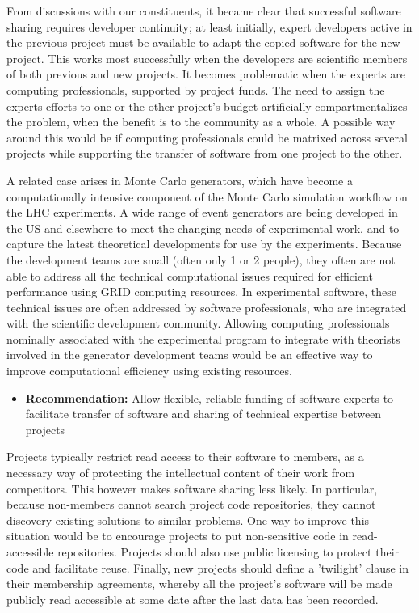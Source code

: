 From discussions with our constituents, it became clear that successful
software sharing requires developer continuity; at least
initially, expert developers active in the previous project must be available
to adapt the copied software for the new project.
This works most successfully when the developers are scientific members
of both previous and new projects.  It becomes problematic
when the experts are computing professionals, supported by project funds.
The need to assign the experts efforts to one or
the other project's budget artificially compartmentalizes the problem,
when the benefit is to the community as a whole.
A possible way around this would be if computing professionals could be
matrixed across several projects while supporting the
transfer of software from one project to the other.

A related case arises in Monte Carlo generators, which
have become a computationally intensive component of the Monte
Carlo simulation workflow on the LHC experiments.  A wide range of event
generators are being developed in the US and elsewhere to meet the
changing needs of experimental work, and to capture the latest
theoretical developments for use by the experiments.   Because the
development teams are small (often only 1 or 2 people), they
often are not able to address all the technical computational
issues required for efficient performance using GRID
computing resources.  In experimental software, these technical issues
are often addressed by software professionals, who are integrated with the
scientific development community.
Allowing computing professionals nominally associated with the experimental program
to integrate with theorists involved in the generator development teams would be an effective
way to improve computational efficiency using existing resources.

\begin{itemize}
\item[] {\bf Recommendation:} 
 Allow flexible, reliable funding of software experts to facilitate transfer of software and sharing of technical expertise between projects
\end{itemize}

Projects typically restrict read access to their software to members, as a necessary
way of protecting the intellectual content of their work from competitors.
This however makes software sharing less likely.  In particular,
because non-members cannot search project code repositories,
they cannot discovery existing solutions to similar problems.
One way to improve this situation would be to encourage projects to put
non-sensitive code in read-accessible repositories.  Projects should also
use public licensing to protect their code and facilitate reuse.  Finally,
new projects should define a 'twilight' clause in their membership agreements,
whereby all the project's software will be made publicly read accessible
at some date after the last data has been recorded.

